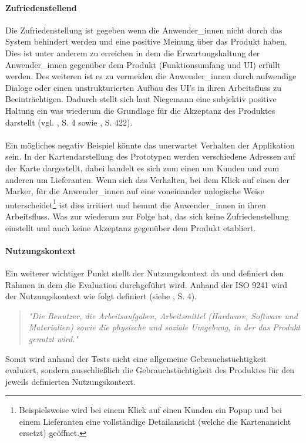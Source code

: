 \documentclass[Bachelorarbeit.tex]{subfiles}
\begin{document}
\paragraph{Zufriedenstellend}
Die Zufriedenstellung ist gegeben wenn die Anwender\_innen nicht durch das System behindert werden und eine positive Meinung über das Produkt haben.
Dies ist unter anderem zu erreichen in dem die Erwartungshaltung der Anwender\_innen gegenüber dem Produkt (Funktionsumfang und \ac{UI}) erfüllt werden.
Des weiteren ist es zu vermeiden  die Anwender\_innen durch aufwendige Dialoge oder einen unstrukturierten Aufbau des \ac{UI}'s in ihren Arbeitsfluss zu Beeinträchtigen.
Dadurch stellt sich laut Niegemann eine subjektiv positive Haltung ein was wiederum die Grundlage für die Akzeptanz des Produktes darstellt (vgl. \cite{Iso9241_11}, S. 4 sowie \cite{Niegemann2008}, S. 422).\\
\\
Ein mögliches negativ Beispiel könnte das unerwartet Verhalten der Applikation sein.
In der Kartendarstellung des Prototypen werden verschiedene Adressen auf der Karte dargestellt, dabei handelt es sich zum einen um Kunden und zum anderen um Lieferanten. 
Wenn sich das Verhalten, bei dem Klick auf einen der Marker, für die Anwender\_innen auf eine voneinander unlogische Weise unterscheidet\footnote{Beispielsweise wird bei einem Klick auf einen Kunden ein Popup  und bei einem Lieferanten eine vollständige Detailansicht (welche die Kartenansicht ersetzt) geöffnet.} ist dies irritiert und hemmt die Anwender\_innen in ihren Arbeitsfluss.
Was zur wiederum zur Folge hat, das sich keine Zufriedenstellung einstellt und auch keine Akzeptanz gegenüber dem Produkt etabliert.


\paragraph{Nutzungskontext}

Ein weiterer wichtiger Punkt stellt der Nutzungskontext da und definiert den Rahmen in dem die Evaluation durchgeführt wird.
Anhand der ISO 9241 wird der Nutzungskontext wie folgt definiert (siehe \cite{Iso9241_11}, S. 4). 

\begin{quote}
\textit{"Die Benutzer, die Arbeitsaufgaben, Arbeitsmittel (Hardware, Software und Materialien) sowie die physische und soziale Umgebung, in der das Produkt genutzt wird."}
\end{quote} 

Somit wird anhand der Tests nicht eine allgemeine Gebrauchstüchtigkeit evaluiert, sondern ausschließlich die Gebrauchstüchtigkeit des Produktes für den jeweils definierten Nutzungskontext.
\end{document}
